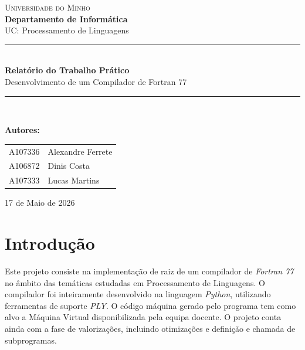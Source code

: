 \documentclass[12pt, a4paper]{article}
\begin{document}
\begin{titlepage}
    \centering
    \vspace*{1cm}
    
    {\large \scshape Universidade do Minho} \\
    \vspace{0.2cm}
    {\large \textbf{Departamento de Informática}} \\
    \vspace{0.2cm}
    {\large UC: Processamento de Linguagens} \\
    
    \vspace{3.5cm}
    
    \rule{\linewidth}{0.6mm} \\[0.4cm]
    {\huge \bfseries Relatório do Trabalho Prático} \\[0.3cm]
    {\Large \color{gray} Desenvolvimento de um Compilador de Fortran 77} \\[0.4cm]
    \rule{\linewidth}{0.6mm} \\
    
    \vfill
    
    {\large \textbf{Autores:}} \\[0.3cm]
    \begin{tabular}{ll}
        A107336 & Alexandre Ferrete \\
        A106872 & Dinis Costa \\
        A107333 & Lucas Martins \\
    \end{tabular}
    
    \vfill
    
    {\large 17 de Maio de 2026}
    
\end{titlepage}

\newpage
\tableofcontents

\newpage
\section{Introdução}
Este projeto consiste na implementação de raiz de um compilador de \textit{Fortran 77} no âmbito das temáticas estudadas em Processamento de Linguagens. O compilador foi inteiramente desenvolvido na linguagem \textit{Python}, utilizando ferramentas de suporte \textit{PLY}. O código máquina gerado pelo programa tem como alvo a Máquina Virtual disponibilizada pela equipa docente. O projeto conta ainda com a fase de valorizações, incluindo otimizações e definição e chamada de subprogramas.
\end{document}
